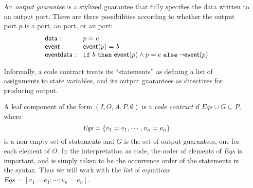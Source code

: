 \begin{definition}
An \emph{output guarantee} is a stylized guarantee that fully
specifies the data written to an output port. There are three
possibilities according to whether the output port $p$ is
a  port, an  port, or an 
port:
\[
\begin{array}{ll}
\mathsf{data}: &  p = \mathit{e} \\
\mathsf{event}: &  \mathsf{event} (p) = \mathit{b} \\
\mathsf{event data}: & \mbox{$\mathtt{if}\ {b}\ \mathtt{then}\ {\mathsf{event} (p) \land p = e}\ \mathtt{else}\ {\neg \mathsf{event}(p)}$} \\
\end{array}
\]
\end{definition}

Informally, a code contract treats its  ``statements'' as
defining a list of assignments to state variables, and its output
guarantees as directives for producing output.

\begin{definition} A
  leaf component of the form $(I,O,A,P,\emptyset)$ is a
  \emph{code contract} if $\mathit{Eqs} \cup G \subseteq P$, where
\[\mathit{Eqs} = \{ {v_1 = e_1, \cdots , v_n = e_n} \} \] is a non-empty set
of  statements and $G$ is the set of output guarantees, one for
each element of $O$. In the interpretation as code, the order of
elements of $\mathit{Eqs}$ is important, and is simply taken to be the
occurrence order of the  statements in the syntax. Thus we
will work with the
\emph{list} of equations $\mathit{Eqs} = [v_1 = e_1; \cdots ; v_n = e_n]$.
\end{definition}
